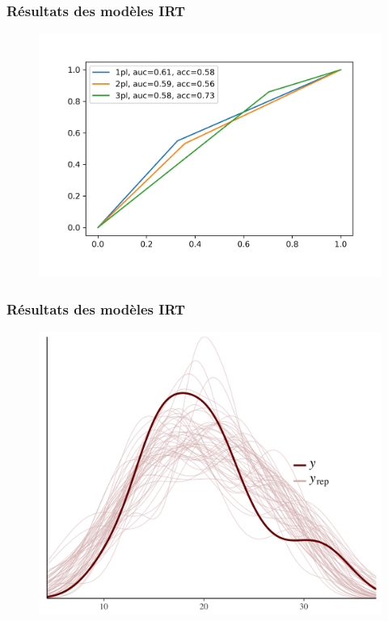 \documentclass[aspectratio=169,professionalfonts, 12pt]{beamer}
\begin{document}
\begin{frame}
  \frametitle{Résultats des modèles IRT}
  \justifying 
  \begin{minipage}{\textwidth}
    \begin{figure}[H]
      \begin{center}
        \includegraphics[scale=0.6]{images/contribution/roc_auc.png}
      \end{center}
    \end{figure}
  \end{minipage}
\end{frame}

\begin{frame}
  \frametitle{Résultats des modèles IRT}
  \justifying 
  \begin{minipage}{\textwidth}
    \begin{figure}[H]
      \begin{center}
        \includegraphics[scale=0.11]{images/etat_art/ppc.png}
      \end{center}
    \end{figure}
  \end{minipage}
\end{frame}
\end{document}
